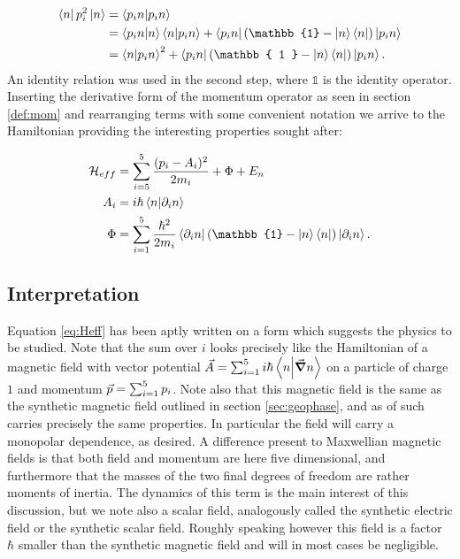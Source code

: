 \documentclass[a4paper]{article}
\begin{document}
\begin{align*}
        \bra{n} p_i^2\ket{n} &= \bra{p_i n} \ket{p_i n}\\
                                                 &=
                                                 \bra{p_i
                                                 n}\ket{n}\bra{n}\ket{p_i n}
                                                 + \bra{p_i n} (\mathbb{1} - \ket{n}
                                                 \bra{n}) \ket{p_i n}\\
                                                 &= \bra{n}\ket{p_i n}^2 +
                                                         \bra{p_i n} (\mathbb{ 1 } -
                                                         \ket{n}\bra{n})\ket{p_i
                                                         n}
.\end{align*}
An identity relation was used in the second step, where \(\mathbb{1}\) is the identity
operator.
Inserting the derivative form of the momentum operator as seen in section \ref{def:mom}
and rearranging terms with some convenient notation we arrive to the Hamiltonian providing the interesting properties
sought after:

\begin{align}\label{eq:Heff}
        \mathbb{\cal H}_{eff} &= \sum_{i=5}^{5} \frac{(p_i - A_i)^2}{2m_i} + \Phi + E_n\\
        A_i &= i\hbar{}\bra{n}\ket{\partial_i n}\\
        \Phi &= \sum_{i=1}^{5} \frac{\hbar{}^{2}}{2m_i}\bra{\partial_i n}(\mathbb{1} - \ket{n}
    \bra{n})\ket{\partial_i n}
.\end{align}
\subsection{Interpretation}\label{sec:BOinterp}
Equation \ref{eq:Heff} has been aptly written on a form which suggests the physics to be
studied. Note that the sum over \(i\) looks precisely like the Hamiltonian of a magnetic field
with vector potential \(\vec{A} = \sum_{i=1}^{5} i\hbar{}\bra{n}\ket{\grad n}\) on a particle of charge
\(1\) and momentum \(\vec{p} = \sum_{i=1}^{5} p_i\). Note also that this magnetic field is
the same as the synthetic magnetic field outlined in section \ref{sec:geophase}, and as of
such carries precisely the same properties. In particular the field will carry a monopolar
dependence, as desired. A difference present to Maxwellian magnetic fields is that both field and momentum are here five dimensional, and
furthermore that the masses of the two final degrees of freedom are rather moments of
inertia. The dynamics of this term is the
main interest of this discussion, but we note also a scalar field, analogously called the
synthetic electric field or the synthetic scalar field. Roughly speaking however this
field is a factor \(\hbar{}\) smaller than the synthetic magnetic field and will in most
cases be negligible. 
\end{document}
